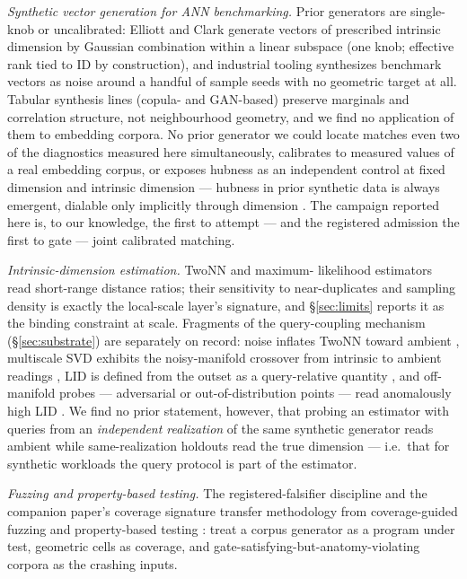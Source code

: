 \documentclass[11pt]{article}
\begin{document}
\emph{Synthetic vector generation for ANN benchmarking.} Prior generators
are single-knob or uncalibrated: Elliott and Clark \cite{elliott24} generate
vectors of prescribed intrinsic dimension by Gaussian combination within a
linear subspace (one knob; effective rank tied to ID by construction), and
industrial tooling synthesizes benchmark vectors as noise around a handful
of sample seeds with no geometric target at all. Tabular synthesis lines
(copula- and GAN-based) preserve marginals and correlation structure, not
neighbourhood geometry, and we find no application of them to embedding
corpora. No prior generator we could locate matches even two of the
diagnostics measured here simultaneously, calibrates to measured values of
a real embedding corpus, or exposes hubness as an independent control at
fixed dimension and intrinsic dimension --- hubness in prior synthetic data
is always emergent, dialable only implicitly through dimension
\cite{radovanovic10}. The campaign reported here is, to our knowledge, the
first to attempt --- and the registered admission the first to gate ---
joint calibrated matching.

\emph{Intrinsic-dimension estimation.} TwoNN \cite{facco17} and maximum-
likelihood \cite{levina04} estimators read short-range distance ratios; their
sensitivity to near-duplicates and sampling density is exactly the
local-scale layer's signature, and \S\ref{sec:limits} reports it as the
binding constraint at scale. Fragments of the query-coupling mechanism
(\S\ref{sec:substrate}) are separately on record: noise inflates TwoNN
toward ambient \cite{facco17}, multiscale SVD exhibits the noisy-manifold
crossover from intrinsic to ambient readings \cite{little17}, LID is
defined from the outset as a query-relative quantity \cite{amsaleg15}, and
off-manifold probes --- adversarial or out-of-distribution points --- read
anomalously high LID \cite{ma18,kamkari24}. We find no prior statement,
however, that probing an estimator with queries from an \emph{independent
realization} of the same synthetic generator reads ambient while
same-realization holdouts read the true dimension --- i.e.\ that for
synthetic workloads the query protocol is part of the estimator.

\emph{Fuzzing and property-based testing.} The registered-falsifier
discipline and the companion paper's coverage signature transfer
methodology from coverage-guided fuzzing \cite{klees18} and property-based
testing \cite{claessen00}: treat a corpus generator as a program under test,
geometric cells as coverage, and gate-satisfying-but-anatomy-violating
corpora as the crashing inputs.
\end{document}
